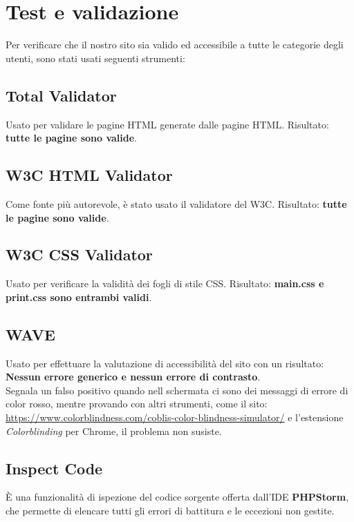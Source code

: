 \documentclass[1_relazione.tex]{subfiles}
\begin{document}
    \section{Test e validazione}\label{sec:test-e-validazione}
    Per verificare che il nostro sito sia valido ed accessibile a tutte le categorie degli utenti, sono stati usati seguenti strumenti:

    \subsection{Total Validator}
    Usato per validare le pagine HTML generate dalle pagine HTML.\newline
    Risultato: \textbf{tutte le pagine sono valide}.
    \subsection{W3C HTML Validator}
    Come fonte pi\`{u} autorevole, \`{e} stato usato il validatore del W3C.\newline
    Risultato: \textbf{tutte le pagine sono valide}.
    \subsection{W3C CSS Validator}
    Usato per verificare la validit\`{a} dei fogli di stile CSS. \newline
    Risultato: \textbf{main.css e print.css sono entrambi validi}.
    \subsection{WAVE}
    Usato per effettuare la valutazione di accessibilit\`{a} del sito con un risultato: \textbf{Nessun errore generico e nessun errore di contrasto}.
    \\Segnala un falso positivo quando nell schermata ci sono dei messaggi di errore di color rosso, mentre provando con altri strumenti, come il sito:\\ \url{https://www.colorblindness.com/coblis-color-blindness-simulator/}
    e l'estensione \textit{Colorblinding} per Chrome, il problema non susiste.
    
    \subsection{Inspect Code}
    \`{E} una funzionalit\`{a} di ispezione del codice sorgente offerta dall'IDE \textbf{PHPStorm}, che permette di elencare tutti gli errori di battitura e le eccezioni non gestite.
\end{document}
